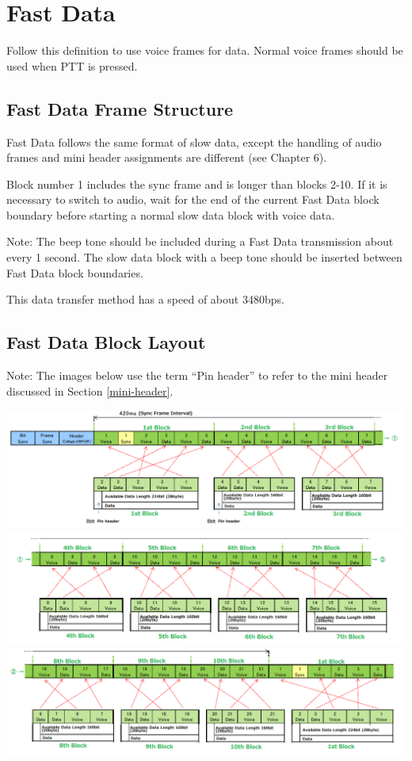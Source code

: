 \documentclass[10pt]{report}
\begin{document}
\setcounter{chapter}{6}
\chapter{Fast Data}

Follow this definition to use voice frames for data.  Normal voice
frames should be used when PTT is pressed.

\section{Fast Data Frame Structure}

Fast Data follows the same format of slow data, except the handling of
audio frames and mini header assignments are different (see Chapter
6).

Block number 1 includes the sync frame and is longer than blocks 2-10.
If it is necessary to switch to audio, wait for the end of the current
Fast Data block boundary before starting a normal slow data block with
voice data.

Note: The beep tone should be included during a Fast Data transmission
about every 1 second.  The slow data block with a beep tone should be
inserted between Fast Data block boundaries.

This data transfer method has a speed of about 3480bps.

\section{Fast Data Block Layout}

Note: The images below use the term ``Pin header'' to refer to the
mini header discussed in Section \ref{mini-header}.

\includegraphics[scale=0.6]{1-3} \\
\includegraphics[scale=0.6]{4-7} \\
\includegraphics[scale=0.6]{8-10}
\end{document}
